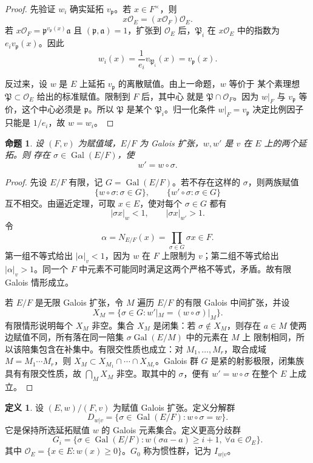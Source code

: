 \documentclass[11pt,a4paper,openany]{ctexbook}
\numberwithin{equation}{chapter}
\newcommand{\OF}{\mathcal{O}_F}
\newcommand{\Gal}{\operatorname{Gal}}
\theoremstyle{plain}
\newtheorem{proposition}[theorem]{命题}
\theoremstyle{definition}
\newtheorem{definition}[theorem]{定义}
\theoremstyle{remark}
\begin{document}
\begin{proof}
先验证 $w_i$ 确实延拓 $v_{\mathfrak p}$。若 $x\in F^\times$，则
\[
x\mathcal O_E=(x\OF)\mathcal O_E.
\]
若 $x\OF=\mathfrak p^{v_{\mathfrak p}(x)}\mathfrak a$ 且
$(\mathfrak p,\mathfrak a)=1$，扩张到 $\mathcal O_E$ 后，$\mathfrak P_i$ 在
$x\mathcal O_E$ 中的指数为 $e_i v_{\mathfrak p}(x)$。因此
\[
w_i(x)=\frac1{e_i}v_{\mathfrak P_i}(x)=v_{\mathfrak p}(x).
\]

反过来，设 $w$ 是 $E$ 上延拓 $v_{\mathfrak p}$ 的离散赋值。由上一命题，$w$ 等价于
某个素理想 $\mathfrak P\subset\mathcal O_E$ 给出的标准赋值。限制到 $F$ 后，其中心
就是 $\mathfrak P\cap\OF$。因为 $w|_F$ 与 $v_{\mathfrak p}$ 等价，这个中心必须是
$\mathfrak p$。所以 $\mathfrak P$ 是某个 $\mathfrak P_i$。归一化条件
$w|_F=v_{\mathfrak p}$ 决定比例因子只能是 $1/e_i$，故 $w=w_i$。
\end{proof}

\begin{proposition}
设 $(F,v)$ 为赋值域，$E/F$ 为 Galois 扩张，$w,w'$ 是 $v$ 在 $E$ 上的两个延拓。则
存在 $\sigma\in\Gal(E/F)$，使
\[
w'=w\circ\sigma.
\]
\end{proposition}

\begin{proof}
先设 $E/F$ 有限，记 $G=\Gal(E/F)$。若不存在这样的 $\sigma$，则两族赋值
\[
\{w\circ\sigma:\sigma\in G\},\qquad
\{w'\circ\sigma:\sigma\in G\}
\]
互不相交。由逼近定理，可取 $x\in E$，使对每个 $\sigma\in G$ 都有
\[
|\sigma x|_w<1,\qquad |\sigma x|_{w'}>1.
\]
令
\[
\alpha=N_{E/F}(x)=\prod_{\sigma\in G}\sigma x\in F.
\]
第一组不等式给出 $|\alpha|_v<1$，因为 $w$ 在 $F$ 上限制为 $v$；第二组不等式给出
$|\alpha|_v>1$。同一个 $F$ 中元素不可能同时满足这两个严格不等式，矛盾。故有限
Galois 情形成立。

若 $E/F$ 是无限 Galois 扩张，令 $M$ 遍历 $E/F$ 的有限 Galois 中间扩张，并设
\[
X_M=\{\sigma\in G:w'|_M=(w\circ\sigma)|_M\}.
\]
有限情形说明每个 $X_M$ 非空。集合 $X_M$ 是闭集：若 $\sigma\notin X_M$，则存在
$a\in M$ 使两边赋值不同，所有落在同一陪集 $\sigma\Gal(E/M)$ 中的元素在 $M$ 上
限制相同，所以该陪集包含在补集中。有限交性质也成立：对
$M_1,\dots,M_r$，取合成域 $M=M_1\cdots M_r$，则
$X_M\subset X_{M_1}\cap\cdots\cap X_{M_r}$。Galois 群 $G$ 是紧的射影极限，闭集族
具有有限交性质，故 $\bigcap_MX_M$ 非空。取其中的 $\sigma$，便有 $w'=w\circ\sigma$
在整个 $E$ 上成立。
\end{proof}

\begin{definition}
设 $(E,w)/(F,v)$ 为赋值 Galois 扩张。定义分解群
\[
D_{w|v}=\{\sigma\in\Gal(E/F):w\circ\sigma=w\}.
\]
它是保持所选延拓赋值 $w$ 的 Galois 元素集合。定义更高分歧群
\[
G_i=\{\sigma\in\Gal(E/F):w(\sigma a-a)\ge i+1,\ \forall a\in\mathcal O_E\}.
\]
其中 $\mathcal O_E=\{x\in E:w(x)\ge0\}$。$G_0$ 称为惯性群，记为 $I_{w|v}$。
\end{definition}
\end{document}
